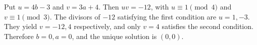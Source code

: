 Put $u=4b-3$ and $v=3a+4$. Then $uv=-12$, with $u\equiv1\pmod4$ and $v\equiv1\pmod3$. The divisors of $-12$ satisfying the first condition are $u=1,-3$. They yield $v=-12,4$ respectively, and only $v=4$ satisfies the second condition. Therefore $b=0,a=0$, and the unique solution is $\boxed{(0,0)}$.
